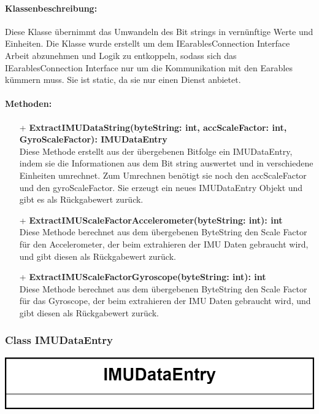 \documentclass[a4paper,12pt]{article}
\begin{document}
\paragraph{Klassenbeschreibung:}
Diese Klasse übernimmt das Umwandeln des Bit strings in vernünftige Werte und Einheiten.
Die Klasse wurde erstellt um dem IEarablesConnection Interface Arbeit abzunehmen und Logik zu entkoppeln, sodass sich das IEarablesConnection
Interface nur um die Kommunikation mit den \Gls{Earables} kümmern muss. Sie ist static, da sie nur einen Dienst anbietet.

\paragraph{Methoden:}
\begin{itemize}
	\item[+] \textbf{ExtractIMUDataString(byteString: int, accScaleFactor: int, GyroScaleFactor): IMUDataEntry}\\Diese Methode erstellt aus der übergebenen Bitfolge ein IMUDataEntry, indem sie die Informationen aus dem Bit string auswertet und in verschiedene Einheiten umrechnet. Zum Umrechnen benötigt sie noch den accScaleFactor und den gyroScaleFactor. Sie erzeugt ein neues IMUDataEntry Objekt und gibt es als Rückgabewert zurück.
	\item[+] \textbf{ExtractIMUScaleFactorAccelerometer(byteString: int): int}\\Diese Methode berechnet aus dem übergebenen ByteString den Scale Factor für den Accelerometer, der beim extrahieren der IMU Daten gebraucht wird, und gibt diesen als Rückgabewert zurück.
	\item[+] \textbf{ExtractIMUScaleFactorGyroscope(byteString: int): int}\\Diese Methode berechnet aus dem übergebenen ByteString den Scale Factor für das Gyroscope, der beim extrahieren der IMU Daten gebraucht wird, und gibt diesen als Rückgabewert zurück.
\end{itemize}


\begin{minipage}[b]{0.7\textwidth}
	\subsubsection{Class IMUDataEntry}
	
	\end{minipage}
	\begin{minipage}[c]{0.3\textwidth}
	\includegraphics[width=\textwidth]{bilder/BibPackageKlassen/IMUDataEntry.png}
\end{minipage}
\end{document}
